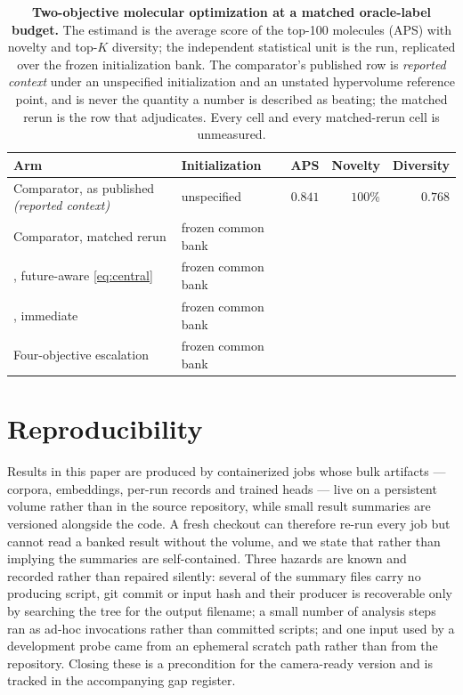 \begin{table}[h]
\centering
\caption{\small\textbf{Two-objective molecular optimization at a matched oracle-label budget.} The estimand is the average score of the top-100 molecules (APS) with novelty and top-$K$ diversity; the independent statistical unit is the run, replicated over the frozen initialization bank. The comparator's published row is \emph{reported context} under an unspecified initialization and an unstated hypervolume reference point, and is never the quantity a \method{} number is described as beating; the matched rerun is the row that adjudicates. Every \method{} cell and every matched-rerun cell is unmeasured.}
\label{tab:multiobj}
\footnotesize
\begin{tabularx}{\textwidth}{@{}lY r r r@{}}
\toprule
Arm & Initialization & APS & Novelty & Diversity\\
\midrule
Comparator, as published \emph{(reported context)} & unspecified & $0.841$ & $100\%$ & $0.768$\\
Comparator, matched rerun & frozen common bank & \XXX{} & \XXX{} & \XXX{}\\
\method{}, future-aware \eqref{eq:central} & frozen common bank & \XXX{} & \XXX{} & \XXX{}\\
\method{}, immediate & frozen common bank & \XXX{} & \XXX{} & \XXX{}\\
Four-objective escalation & frozen common bank & \XXX{} & \XXX{} & \XXX{}\\
\bottomrule
\end{tabularx}
\end{table}
\section{Reproducibility}
\label{app:repro}

Results in this paper are produced by containerized jobs whose bulk artifacts --- corpora, embeddings, per-run records and trained heads --- live on a persistent volume rather than in the source repository, while small result summaries are versioned alongside the code.
A fresh checkout can therefore re-run every job but cannot read a banked result without the volume, and we state that rather than implying the summaries are self-contained.
Three hazards are known and recorded rather than repaired silently: several of the summary files carry no producing script, git commit or input hash and their producer is recoverable only by searching the tree for the output filename; a small number of analysis steps ran as ad-hoc invocations rather than committed scripts; and one input used by a development probe came from an ephemeral scratch path rather than from the repository.
Closing these is a precondition for the camera-ready version and is tracked in the accompanying gap register.

